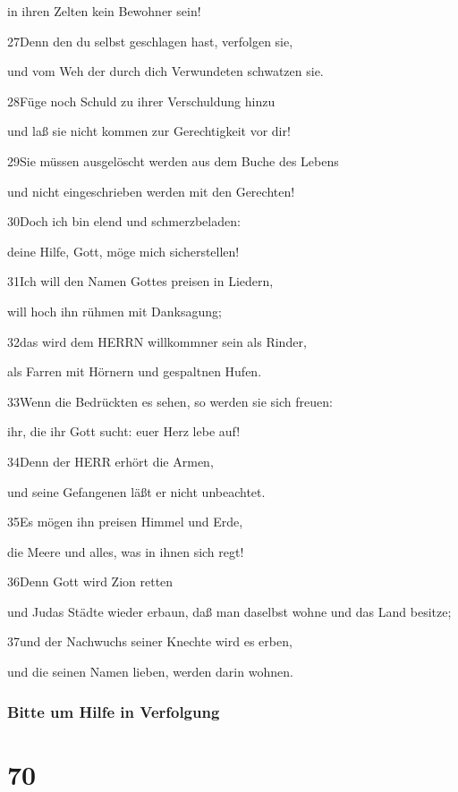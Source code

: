 in ihren Zelten kein Bewohner sein!

27Denn den du selbst geschlagen hast, verfolgen sie,

und vom Weh der durch dich Verwundeten schwatzen sie.

28Füge noch Schuld zu ihrer Verschuldung hinzu

und laß sie nicht kommen zur Gerechtigkeit vor dir!

29Sie müssen ausgelöscht werden aus dem Buche des Lebens

und nicht eingeschrieben werden mit den Gerechten!

30Doch ich bin elend und schmerzbeladen:

deine Hilfe, Gott, möge mich sicherstellen!

31Ich will den Namen Gottes preisen in Liedern,

will hoch ihn rühmen mit Danksagung;

32das wird dem HERRN willkommner sein als Rinder,

als Farren mit Hörnern und gespaltnen Hufen.

33Wenn die Bedrückten es sehen, so werden sie sich freuen:

ihr, die ihr Gott sucht: euer Herz lebe auf!

34Denn der HERR erhört die Armen,

und seine Gefangenen läßt er nicht unbeachtet.

35Es mögen ihn preisen Himmel und Erde,

die Meere und alles, was in ihnen sich regt!

36Denn Gott wird Zion retten

und Judas Städte wieder erbaun, daß man daselbst wohne und das Land
besitze;

37und der Nachwuchs seiner Knechte wird es erben,

und die seinen Namen lieben, werden darin wohnen.

\hypertarget{bitte-um-hilfe-in-verfolgung}{%
\subsubsection{Bitte um Hilfe in
Verfolgung}\label{bitte-um-hilfe-in-verfolgung}}

\hypertarget{section-69}{%
\section{70}\label{section-69}}

